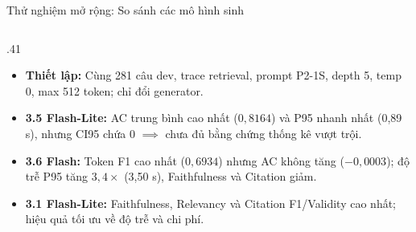 \begin{frame}[t]{Thử nghiệm mở rộng: So sánh các mô hình sinh}
\begin{columns}[T,onlytextwidth]
\begin{column}{.41\textwidth}
{\begin{itemize}
  \setlength{\itemsep}{2pt}
  \item \textbf{Thiết lập:} Cùng 281 câu dev, trace retrieval, prompt P2-1S, depth 5, temp 0, max 512 token; chỉ đổi generator.
  \item \textbf{3.5 Flash-Lite:} AC trung bình cao nhất ($0{,}8164$) và P95 nhanh nhất (0,89 s), nhưng CI95 chứa 0 $\implies$ chưa đủ bằng chứng thống kê vượt trội.
  \item \textbf{3.6 Flash:} Token F1 cao nhất ($0{,}6934$) nhưng AC không tăng ($-0{,}0003$); độ trễ P95 tăng $3{,}4\times$ (3,50 s), Faithfulness và Citation giảm.
  \item \textbf{3.1 Flash-Lite:} Faithfulness, Relevancy và Citation F1/Validity cao nhất; hiệu quả tối ưu về độ trễ và chi phí.
\end{itemize}\par}
\end{column}
\end{columns}
\vspace{1.5mm}
\end{frame}
